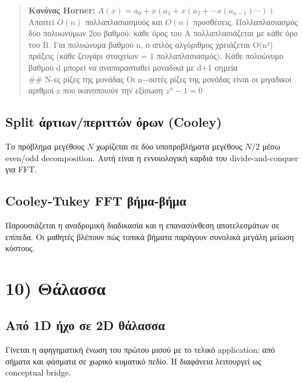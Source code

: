 \documentclass[a4paper, 11pt]{article}
\begin{document}
\begin{quote}
\textbf{Κανόνας Horner:}
\(A(x) = a_0 + x(a_1 + x(a_2 + \cdots x(a_{n-1})\cdots))\)\\
Απαιτεί \(O(n)\) πολλαπλασιασμούς και \(O(n)\) προσθέσεις.
Πολλαπλασιασμός δύο πολυωνύμων 2ου βαθμού: κάθε όρος του A
πολλαπλασιάζεται με κάθε όρο του B. Για πολυώνυμα βαθμού n, ο απλός
αλγόριθμος χρειάζεται O(n²) πράξεις (κάθε ζευγάρι στοιχείων = 1
πολλαπλασιασμός). Κάθε πολυώνυμο βαθμού d μπορεί να αναπαρασταθεί
μοναδικά με d+1 σημεία\\
\#\# N-ες ρίζες της μονάδας Οι n−οστές ρίζες της μονάδας είναι οι
μιγαδικοί αριθμοί z που ικανοποιούν την εξίσωση \(z^n-1=0\)
\end{quote}

\subsection{Split άρτιων/περιττών όρων
(Cooley)}\label{split-ux3acux3c1ux3c4ux3b9ux3c9ux3bdux3c0ux3b5ux3c1ux3b9ux3c4ux3c4ux3ceux3bd-ux3ccux3c1ux3c9ux3bd-cooley}

Το πρόβλημα μεγέθους \(N\) χωρίζεται σε δύο υποπροβλήματα μεγέθους
\(N/2\) μέσω even/odd decomposition. Αυτή είναι η εννοιολογική καρδιά
του divide-and-conquer για FFT.

\subsection{Cooley-Tukey FFT
βήμα-βήμα}\label{cooley-tukey-fft-ux3b2ux3aeux3bcux3b1-ux3b2ux3aeux3bcux3b1}

Παρουσιάζεται η αναδρομική διαδικασία και η επανασύνθεση αποτελεσμάτων
σε επίπεδα. Οι μαθητές βλέπουν πώς τοπικά βήματα παράγουν συνολικά
μεγάλη μείωση κόστους.

\section{10) Θάλασσα}\label{ux3b8ux3acux3bbux3b1ux3c3ux3c3ux3b1}

\subsection{Από 1D ήχο σε 2D
θάλασσα}\label{ux3b1ux3c0ux3cc-1d-ux3aeux3c7ux3bf-ux3c3ux3b5-2d-ux3b8ux3acux3bbux3b1ux3c3ux3c3ux3b1}

Γίνεται η αφηγηματική ένωση του πρώτου μισού με το τελικό application:
από σήματα και φάσματα σε χωρικό κυματικό πεδίο. Η διαφάνεια λειτουργεί
ως conceptual bridge.
\end{document}
